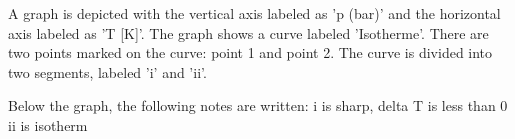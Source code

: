 A graph is depicted with the vertical axis labeled as 'p (bar)' and the horizontal axis labeled as 'T [K]'. The graph shows a curve labeled 'Isotherme'. There are two points marked on the curve: point 1 and point 2. The curve is divided into two segments, labeled 'i' and 'ii'. 

Below the graph, the following notes are written:
i is sharp, delta T is less than 0
ii is isotherm